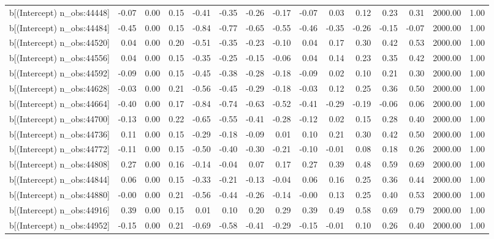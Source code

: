 \begin{table}[ht]
\begin{tabular}{rrrrrrrrrrrrrrr}
  b[(Intercept) n\_obs:44448] & -0.07 & 0.00 & 0.15 & -0.41 & -0.35 & -0.26 & -0.17 & -0.07 & 0.03 & 0.12 & 0.23 & 0.31 & 2000.00 & 1.00 \\ 
  b[(Intercept) n\_obs:44484] & -0.45 & 0.00 & 0.15 & -0.84 & -0.77 & -0.65 & -0.55 & -0.46 & -0.35 & -0.26 & -0.15 & -0.07 & 2000.00 & 1.00 \\ 
  b[(Intercept) n\_obs:44520] & 0.04 & 0.00 & 0.20 & -0.51 & -0.35 & -0.23 & -0.10 & 0.04 & 0.17 & 0.30 & 0.42 & 0.53 & 2000.00 & 1.00 \\ 
  b[(Intercept) n\_obs:44556] & 0.04 & 0.00 & 0.15 & -0.35 & -0.25 & -0.15 & -0.06 & 0.04 & 0.14 & 0.23 & 0.35 & 0.42 & 2000.00 & 1.00 \\ 
  b[(Intercept) n\_obs:44592] & -0.09 & 0.00 & 0.15 & -0.45 & -0.38 & -0.28 & -0.18 & -0.09 & 0.02 & 0.10 & 0.21 & 0.30 & 2000.00 & 1.00 \\ 
  b[(Intercept) n\_obs:44628] & -0.03 & 0.00 & 0.21 & -0.56 & -0.45 & -0.29 & -0.18 & -0.03 & 0.12 & 0.25 & 0.36 & 0.50 & 2000.00 & 1.00 \\ 
  b[(Intercept) n\_obs:44664] & -0.40 & 0.00 & 0.17 & -0.84 & -0.74 & -0.63 & -0.52 & -0.41 & -0.29 & -0.19 & -0.06 & 0.06 & 2000.00 & 1.00 \\ 
  b[(Intercept) n\_obs:44700] & -0.13 & 0.00 & 0.22 & -0.65 & -0.55 & -0.41 & -0.28 & -0.12 & 0.02 & 0.15 & 0.28 & 0.40 & 2000.00 & 1.00 \\ 
  b[(Intercept) n\_obs:44736] & 0.11 & 0.00 & 0.15 & -0.29 & -0.18 & -0.09 & 0.01 & 0.10 & 0.21 & 0.30 & 0.42 & 0.50 & 2000.00 & 1.00 \\ 
  b[(Intercept) n\_obs:44772] & -0.11 & 0.00 & 0.15 & -0.50 & -0.40 & -0.30 & -0.21 & -0.10 & -0.01 & 0.08 & 0.18 & 0.26 & 2000.00 & 1.00 \\ 
  b[(Intercept) n\_obs:44808] & 0.27 & 0.00 & 0.16 & -0.14 & -0.04 & 0.07 & 0.17 & 0.27 & 0.39 & 0.48 & 0.59 & 0.69 & 2000.00 & 1.00 \\ 
  b[(Intercept) n\_obs:44844] & 0.06 & 0.00 & 0.15 & -0.33 & -0.21 & -0.13 & -0.04 & 0.06 & 0.16 & 0.25 & 0.36 & 0.44 & 2000.00 & 1.00 \\ 
  b[(Intercept) n\_obs:44880] & -0.00 & 0.00 & 0.21 & -0.56 & -0.44 & -0.26 & -0.14 & -0.00 & 0.13 & 0.25 & 0.40 & 0.53 & 2000.00 & 1.00 \\ 
  b[(Intercept) n\_obs:44916] & 0.39 & 0.00 & 0.15 & 0.01 & 0.10 & 0.20 & 0.29 & 0.39 & 0.49 & 0.58 & 0.69 & 0.79 & 2000.00 & 1.00 \\ 
  b[(Intercept) n\_obs:44952] & -0.15 & 0.00 & 0.21 & -0.69 & -0.58 & -0.41 & -0.29 & -0.15 & -0.01 & 0.10 & 0.26 & 0.40 & 2000.00 & 1.00 \\ 

\end{tabular}
\end{table}
